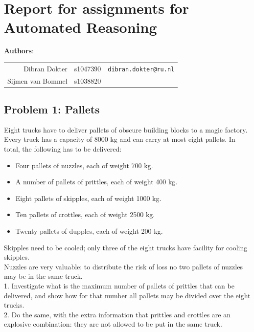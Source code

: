 \documentclass[12pt]{article}
\begin{document}
\section*{Report for assignments for Automated Reasoning}

\begin{center}
\textbf{Authors}: \\
\begin{tabular}{rcl}
Dibran Dokter & s1047390 & {\tt dibran.dokter@ru.nl} \\
Sijmen van Bommel & s1038820 
\end{tabular}
\end{center}

\vspace{8mm}

\subsection*{Problem 1: Pallets}

Eight trucks have to deliver pallets of obscure building blocks to a magic factory. Every truck
has a capacity of 8000 kg and can carry at most eight pallets. In total, the following has to
be delivered: \\
\begin{itemize}
    \item Four pallets of nuzzles, each of weight 700 kg.
    \item A number of pallets of prittles, each of weight 400 kg.
    \item Eight pallets of skipples, each of weight 1000 kg.
    \item Ten pallets of crottles, each of weight 2500 kg.
    \item Twenty pallets of dupples, each of weight 200 kg.
\end{itemize}

\vspace{8mm}

Skipples need to be cooled; only three of the eight trucks have facility for cooling skipples. \\
Nuzzles are very valuable: to distribute the risk of loss no two pallets of nuzzles may be
in the same truck. \\
1. Investigate what is the maximum number of pallets of prittles that can be delivered,
and show how for that number all pallets may be divided over the eight trucks.\\
2. Do the same, with the extra information that prittles and crottles are an explosive
combination: they are not allowed to be put in the same truck.\\
\end{document}
